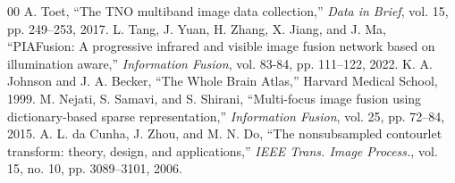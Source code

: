 \documentclass[conference]{IEEEtran}
\begin{document}
\begin{thebibliography}{00}
 A. Toet, ``The TNO multiband image data collection,'' \textit{Data in Brief}, vol. 15, pp. 249--253, 2017.
 L. Tang, J. Yuan, H. Zhang, X. Jiang, and J. Ma, ``PIAFusion: A progressive infrared and visible image fusion network based on illumination aware,'' \textit{Information Fusion}, vol. 83-84, pp. 111--122, 2022.
 K. A. Johnson and J. A. Becker, ``The Whole Brain Atlas,'' Harvard Medical School, 1999.
 M. Nejati, S. Samavi, and S. Shirani, ``Multi-focus image fusion using dictionary-based sparse representation,'' \textit{Information Fusion}, vol. 25, pp. 72--84, 2015.
 A. L. da Cunha, J. Zhou, and M. N. Do, ``The nonsubsampled contourlet transform: theory, design, and applications,'' \textit{IEEE Trans. Image Process.}, vol. 15, no. 10, pp. 3089--3101, 2006.
\end{thebibliography}
\end{document}
